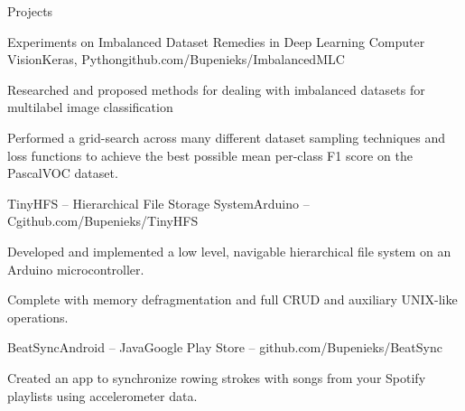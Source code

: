 \documentclass{resume} %
\begin{document}
\begin{rSection}{Projects}



\begin{rSubsection}{Experiments on Imbalanced Dataset Remedies in Deep Learning Computer Vision}{}{Keras, Python}{github.com/Bupenieks/ImbalancedMLC}
	\item Researched and proposed methods for dealing with imbalanced datasets for multilabel image classification %
	
	\item Performed a grid-search across many different dataset sampling techniques and loss functions to achieve the best possible mean per-class F1 score on the PascalVOC dataset.
\end{rSubsection}

\begin{rSubsection}{TinyHFS -- Hierarchical File Storage System}{}{Arduino -- C}{github.com/Bupenieks/TinyHFS}

\item Developed and implemented a low level, navigable hierarchical file system on an Arduino microcontroller.%
\item Complete with memory defragmentation and full CRUD and auxiliary UNIX-like operations.
\end{rSubsection}


\begin{rSubsection}{BeatSync}{}{Android -- Java}{Google Play Store -- github.com/Bupenieks/BeatSync}
\item Created an app to synchronize rowing strokes with songs from your Spotify playlists using accelerometer data.
\end{rSubsection}





\end{rSection}
\end{document}
